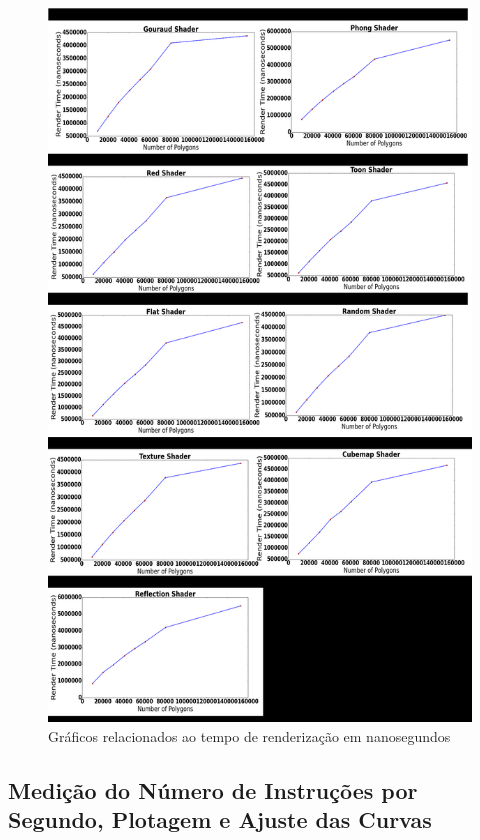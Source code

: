 	\begin{figure}[ht]
	\centering
		\includegraphics[keepaspectratio=true,scale=0.35]{figuras/render_time.png}
	\caption{Gráficos relacionados ao tempo de renderização em nanosegundos}
	\label{render_time}
	\end{figure}

\subsection{Medição do Número de Instruções por Segundo, Plotagem e Ajuste das Curvas}

